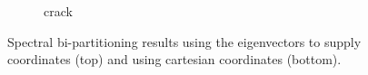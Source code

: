 \begin{figure}[H]
\begin{subfigure}{0.5\textwidth}
		\caption{crack}
		\label{fig:inert_crack}
	\end{subfigure}
	\caption{Spectral bi-partitioning results using the eigenvectors to supply coordinates (top) and using cartesian coordinates (bottom).}
	\label{fig:rec_bi}
\end{figure}

